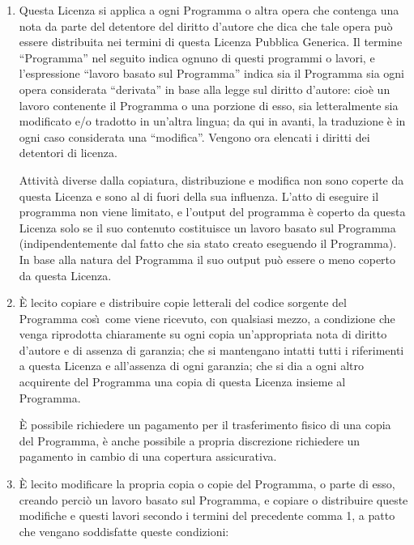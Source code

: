 \begin{enumerate}  \addtocounter{enumi}{-1}

\item Questa Licenza si applica a ogni Programma o altra
  opera che contenga una nota da parte del detentore del
  diritto d'autore che dica che tale opera pu\`o essere
  distribuita nei termini di questa Licenza Pubblica
  Generica. Il termine ``Programma'' nel seguito indica
  ognuno di questi programmi o lavori, e l'espressione
  ``lavoro basato sul Programma'' indica sia il Programma
  sia ogni opera considerata ``derivata'' in base alla legge
  sul diritto d'autore: cio\`e un lavoro contenente il
  Programma o una porzione di esso, sia letteralmente sia
  modificato e/o tradotto in un'altra lingua; da qui in
  avanti, la traduzione \`e in ogni caso considerata una
  ``modifica''.  Vengono ora elencati i diritti dei
  detentori di licenza.

  Attivit\`a diverse dalla copiatura, distribuzione e
  modifica non sono coperte da questa Licenza e sono al di
  fuori della sua influenza. L'atto di eseguire il programma
  non viene limitato, e l'output del programma \`e coperto
  da questa Licenza solo se il suo contenuto costituisce un
  lavoro basato sul Programma (indipendentemente dal fatto
  che sia stato creato eseguendo il Programma). In base alla
  natura del Programma il suo output pu\`o essere o meno
  coperto da questa Licenza.

\item \`E lecito copiare e distribuire copie letterali del
  codice sorgente del Programma cos\`\i\ come viene
  ricevuto, con qualsiasi mezzo, a condizione che venga
  riprodotta chiaramente su ogni copia un'appropriata nota
  di diritto d'autore e di assenza di garanzia; che si
  mantengano intatti tutti i riferimenti a questa Licenza e
  all'assenza di ogni garanzia; che si dia a ogni altro
  acquirente del Programma una copia di questa Licenza
  insieme al Programma.

  \`E possibile richiedere un pagamento per il trasferimento
  fisico di una copia del Programma, \`e anche possibile a
  propria discrezione richiedere un pagamento in cambio di
  una copertura assicurativa.

\item \`E lecito modificare la propria copia o copie del
  Programma, o parte di esso, creando perci\`o un lavoro
  basato sul Programma, e copiare o distribuire queste
  modifiche e questi lavori secondo i termini del precedente
  comma 1, a patto che vengano soddisfatte queste
  condizioni:


\end{enumerate}
